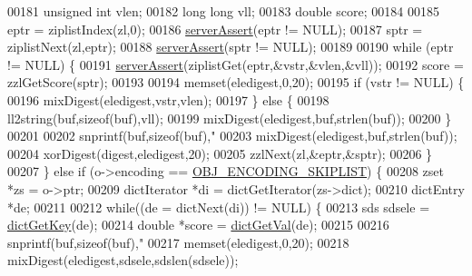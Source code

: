 \begin{DoxyCode}
00181                     \textcolor{keywordtype}{unsigned} \textcolor{keywordtype}{int} vlen;
00182                     \textcolor{keywordtype}{long} \textcolor{keywordtype}{long} vll;
00183                     \textcolor{keywordtype}{double} score;
00184 
00185                     eptr = ziplistIndex(zl,0);
00186                     \hyperlink{server_8h_a88114b5169b4c382df6b56506285e56a}{serverAssert}(eptr != NULL);
00187                     sptr = ziplistNext(zl,eptr);
00188                     \hyperlink{server_8h_a88114b5169b4c382df6b56506285e56a}{serverAssert}(sptr != NULL);
00189 
00190                     \textcolor{keywordflow}{while} (eptr != NULL) \{
00191                         \hyperlink{server_8h_a88114b5169b4c382df6b56506285e56a}{serverAssert}(ziplistGet(eptr,&vstr,&vlen,&vll));
00192                         score = zzlGetScore(sptr);
00193 
00194                         memset(eledigest,0,20);
00195                         \textcolor{keywordflow}{if} (vstr != NULL) \{
00196                             mixDigest(eledigest,vstr,vlen);
00197                         \} \textcolor{keywordflow}{else} \{
00198                             ll2string(buf,\textcolor{keyword}{sizeof}(buf),vll);
00199                             mixDigest(eledigest,buf,strlen(buf));
00200                         \}
00201 
00202                         snprintf(buf,\textcolor{keyword}{sizeof}(buf),\textcolor{stringliteral}{"%
00203                         mixDigest(eledigest,buf,strlen(buf));
00204                         xorDigest(digest,eledigest,20);
00205                         zzlNext(zl,&eptr,&sptr);
00206                     \}
00207                 \} \textcolor{keywordflow}{else} \textcolor{keywordflow}{if} (o->encoding == \hyperlink{server_8h_acfb35db5cb30ed113ed23aeb1a224c4c}{OBJ\_ENCODING\_SKIPLIST}) \{
00208                     zset *zs = o->ptr;
00209                     dictIterator *di = dictGetIterator(zs->dict);
00210                     dictEntry *de;
00211 
00212                     \textcolor{keywordflow}{while}((de = dictNext(di)) != NULL) \{
00213                         sds sdsele = \hyperlink{dict_8h_a3271c334309904a3086deca94f96e46e}{dictGetKey}(de);
00214                         \textcolor{keywordtype}{double} *score = \hyperlink{dict_8h_ae8d2cc391873b2bea2b87c4f80f43120}{dictGetVal}(de);
00215 
00216                         snprintf(buf,\textcolor{keyword}{sizeof}(buf),\textcolor{stringliteral}{"%
00217                         memset(eledigest,0,20);
00218                         mixDigest(eledigest,sdsele,sdslen(sdsele));
}}
\end{DoxyCode}
